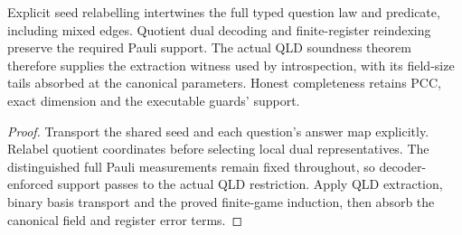 \begin{lemma}
\label{lem:intro-numbered-transport}
\leanok
Explicit seed relabelling intertwines the full typed question law and
predicate, including mixed edges. Quotient dual decoding and finite-register
reindexing preserve the required Pauli support. The actual QLD soundness
theorem therefore supplies the extraction witness used by introspection,
with its field-size tails absorbed at the canonical parameters. Honest
completeness retains PCC, exact dimension and the executable guards' support.
\end{lemma}
\begin{proof}
\leanok
Transport the shared seed and each question's answer map explicitly.
Relabel quotient coordinates before selecting local dual representatives.
The distinguished full Pauli measurements remain fixed throughout, so
decoder-enforced support passes to the actual QLD restriction. Apply QLD
extraction, binary basis transport and the proved finite-game induction,
then absorb the canonical field and register error terms.
\end{proof}

